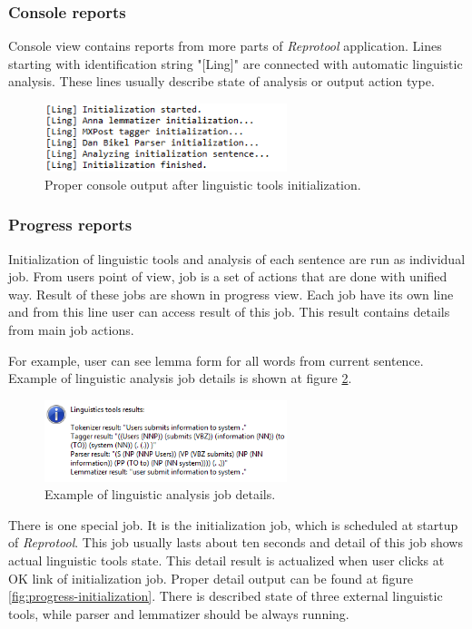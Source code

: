 \subsubsection{Console reports}
Console view contains reports from more parts of \emph{Reprotool} application. Lines starting with identification string "[Ling]" are connected with automatic linguistic analysis. These lines usually describe state of analysis or output action type.

\begin{figure}[ht]
  \centering
  \includegraphics[width=200pt]{images/manual-analysis/console-initialization}
  \caption{Proper console output after linguistic tools initialization.}
  \label{fig:console-initialization}
\end{figure}

\subsubsection{Progress reports}
Initialization of linguistic tools and analysis of each sentence are run as individual job. From users point of view, job is a set of actions that are done with unified way. Result of these jobs are shown in progress view. Each job have its own line and from this line user can access result of this job. This result contains details from main job actions. 

For example, user can see lemma form for all words from current sentence. Example of linguistic analysis job details is shown at figure \ref{fig:progress-detail}.

\begin{figure}[ht]
  \centering
  \includegraphics[width=200pt]{images/manual-analysis/progress-detail}
  \caption{Example of linguistic analysis job details.}
  \label{fig:progress-detail}
\end{figure}

There is one special job. It is the initialization job, which is scheduled at startup of  \emph{Reprotool}. This job usually lasts about ten seconds and detail of this job shows actual linguistic tools state. This detail result is actualized when user clicks at OK link of initialization job. Proper detail output can be found at figure \ref{fig:progress-initialization}. There is described state of three external linguistic tools, while parser and lemmatizer should be always running. 

